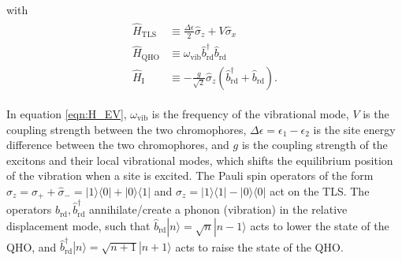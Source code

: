 \documentclass[11pt]{article}
\begin{document}
with 
\begin{align*}
    \begin{aligned}
        \hat{H}_{\scriptscriptstyle \text{TLS}} &\equiv \frac{\Delta\epsilon}{2}\hat{\sigma}_z + V\hat{\sigma}_x \\
        \hat{H}_{\scriptscriptstyle \text{QHO}} &\equiv \omega_{\scriptscriptstyle \text{vib}} \hat{b}_{\scriptscriptstyle \text{rd}}^\dagger \hat{b}_{\scriptscriptstyle \text{rd}} \\
        \hat{H}_{\scriptscriptstyle \text{I}} &\equiv-\frac{g}{\sqrt{2}}\hat{\sigma}_z\left(\hat{b}_{\scriptscriptstyle \text{rd}}^\dagger + \hat{b}_{\scriptscriptstyle \text{rd}}\right).
    \end{aligned}
\end{align*}

In equation \eqref{eqn:H_EV}, $ \omega_{\scriptscriptstyle \text{vib}}$ is the frequency of the vibrational mode, $V$ is the coupling strength between the two chromophores, $\Delta\epsilon = \epsilon_1 - \epsilon_2$ is the site energy difference between the two chromophores, and $g$ is the coupling strength of the excitons and their local vibrational modes, which shifts the equilibrium position of the vibration when a site is excited. The Pauli spin operators of the form $\hat{\sigma}_z = \hat{\sigma}_+ + \hat{\sigma}_- = |1\rangle\langle 0| + |0\rangle\langle 1|$ and $\hat{\sigma}_z = |1\rangle\langle1| - |0\rangle\langle0|$ act on the TLS. The operators $\hat{b}_{\scriptscriptstyle \text{rd}}, \hat{b}_{\scriptscriptstyle \text{rd}}^\dagger$ annihilate/create a phonon (vibration) in the relative displacement mode, such that $\hat{b}_{\scriptscriptstyle \text{rd}}|n\rangle = \sqrt{n}|n-1\rangle$ acts to lower the state of the QHO, and $\hat{b}_{\scriptscriptstyle \text{rd}}^{\dagger}|n\rangle = \sqrt{n+1}|n+1\rangle$ acts to raise the state of the QHO.
\end{document}
